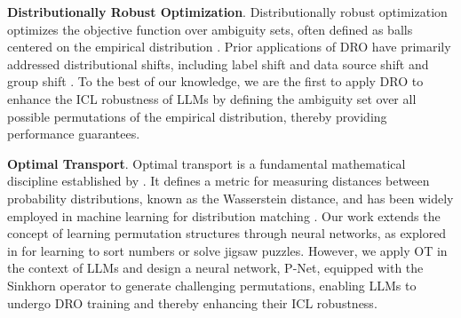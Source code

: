 \noindent \textbf{Distributionally Robust Optimization}.
Distributionally robust optimization optimizes the objective function over ambiguity sets, often defined as balls centered on the empirical distribution \citep{BenTal2013Robust, Lam2015Quantifying, Duchi2016, Miyato2018Virtual}. 
Prior applications of DRO have primarily addressed distributional shifts, including label shift \citep{hu2018does} and data source shift \citep{oren2019drolm} and group shift \citep{2020Distributionally}. 
To the best of our knowledge, we are the first to apply DRO to enhance the ICL robustness of LLMs by defining the ambiguity set over all possible permutations of the empirical distribution, thereby providing performance guarantees.

\noindent \textbf{Optimal Transport}. 
Optimal transport is a fundamental mathematical discipline established by \citet{monge1781memoire,kantorovich1942transfer}. It defines a metric for measuring distances between probability distributions, known as the Wasserstein distance, and has been widely employed in machine learning for distribution matching \citep{montesuma2024recentadvancesoptimaltransport,ot_ds_2024}. 
Our work extends the concept of learning permutation structures through neural networks, as explored in \citep{mena2018learning} for learning to sort numbers or solve jigsaw puzzles. 
However, we apply OT in the context of LLMs and design a neural network, P-Net, equipped with the Sinkhorn operator to generate challenging permutations, enabling LLMs to undergo DRO training and thereby enhancing their ICL robustness.